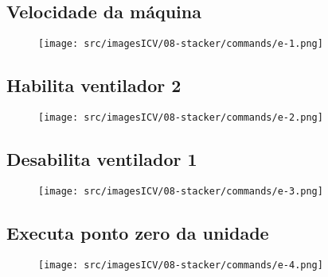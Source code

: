 \thispagestyle{fancy}
\vspace*{40 pt}
\subsection{\small {Velocidade da máquina}}
\vspace*{\fill}
\begin{figure}[h]
    \centering
    \texttt{[image: src/imagesICV/08-stacker/commands/e-1.png]}
\end{figure}
\vspace*{\fill}

\newpage
\thispagestyle{fancy}
\vspace*{40 pt}
\subsection{\small {Habilita ventilador 2}}
\vspace*{\fill}
\begin{figure}[h]
    \centering
    \texttt{[image: src/imagesICV/08-stacker/commands/e-2.png]}
\end{figure}
\vspace*{\fill}

\newpage
\thispagestyle{fancy}
\vspace*{40 pt}
\subsection{\small {Desabilita ventilador 1}}
\vspace*{\fill}
\begin{figure}[h]
    \centering
    \texttt{[image: src/imagesICV/08-stacker/commands/e-3.png]}
\end{figure}
\vspace*{\fill}

\newpage
\thispagestyle{fancy}
\vspace*{40 pt}
\subsection{\small {Executa ponto zero da unidade}}
\vspace*{\fill}
\begin{figure}[h]
    \centering
    \texttt{[image: src/imagesICV/08-stacker/commands/e-4.png]}
\end{figure}
\vspace*{\fill}

